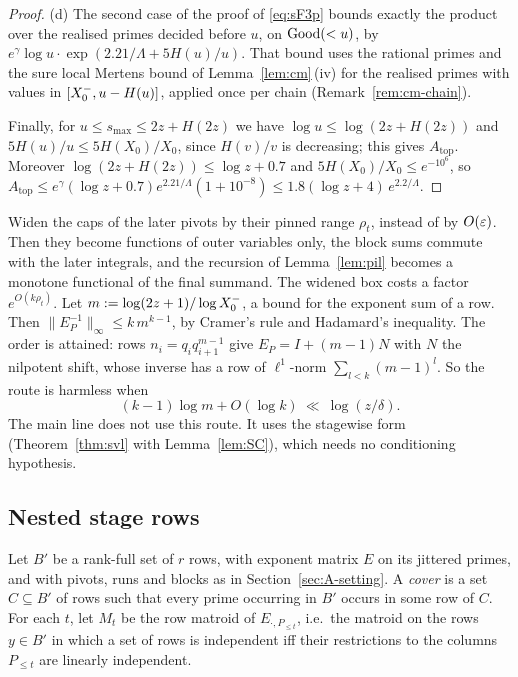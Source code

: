 \begin{proof}
(d) The second case of the proof of \ref{eq:sF3p} bounds exactly the product over the realised primes decided before
$u$, on $\mathrm{Good}(<u)$, by $e^{\gamma}\log u\cdot\exp(2.21/\Lambda+5H(u)/u)$. That bound uses the rational primes
\cite[Thm.~8, (3.29)]{RosserSchoenfeld1962} and the sure local Mertens bound of Lemma~\ref{lem:cm}\,(iv) for the
realised primes with values in $[X_0^{-},u-H(u)]$, applied once per chain (Remark~\ref{rem:cm-chain}).

Finally, for $u\le s_{\max}\le2z+H(2z)$ we have $\log u\le\log(2z+H(2z))$ and $5H(u)/u\le5H(X_0)/X_0$, since $H(v)/v$
is decreasing; this gives $A_{\mathrm{top}}$. Moreover $\log(2z+H(2z))\le\log z+0.7$ and $5H(X_0)/X_0\le e^{-10^{6}}$,
so $A_{\mathrm{top}}\le e^{\gamma}(\log z+0.7)e^{2.21/\Lambda}(1+10^{-8})\le1.8(\log z+4)\,e^{2.2/\Lambda}$.
\end{proof}

\begin{remark}\label{rem:widened}
Widen the caps of the later pivots by their pinned range $\rho_t$, instead of by $O(\varepsilon)$. Then they become
functions of outer variables only, the block sums commute with the later integrals, and the recursion of
Lemma~\ref{lem:pil} becomes a monotone functional of the final summand. The widened box costs a factor $e^{O(k\rho_t)}$.
Let $m:=\log(2z+1)/\log X_0^{-}$, a bound for the exponent sum of a row. Then $\|E_P^{-1}\|_\infty\le k\,m^{k-1}$, by Cramer's rule and
Hadamard's inequality. The order is attained: rows $n_i=q_iq_{i+1}^{m-1}$ give $E_P=I+(m-1)N$ with $N$ the nilpotent
shift, whose inverse has a row of $\ell^1$-norm $\sum_{l<k}(m-1)^l$. So the route is harmless when
\[
  (k-1)\log m+O(\log k)\ \ll\ \log(z/\delta).
\]
The main line does not use this route. It uses the stagewise form (Theorem~\ref{thm:svl} with Lemma~\ref{lem:SC}),
which needs no conditioning hypothesis.
\end{remark}

\subsection{Nested stage rows}\label{sec:A-SC}

Let $B'$ be a rank-full set of $r$ rows, with exponent matrix $E$ on its jittered primes, and with pivots, runs and blocks
as in Section~\ref{sec:A-setting}. A \emph{cover} is a set $C\subseteq B'$ of rows such that every prime occurring in
$B'$ occurs in some row of $C$. For each $t$, let $M_t$ be the row matroid of $E_{\cdot,P_{\le t}}$, i.e.\ the matroid on
the rows $y\in B'$ in which a set of rows is independent iff their restrictions to the columns $P_{\le t}$ are linearly
independent.

